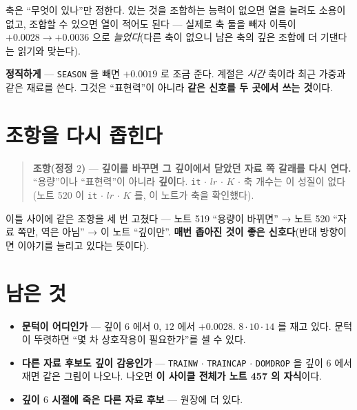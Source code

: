 \documentclass[11pt]{article}
\begin{document}
축은 ``무엇이 있나''만 정한다. 있는 것을 조합하는 능력이 없으면 열을
늘려도 소용이 없고, 조합할 수 있으면 열이 적어도 된다 --- 실제로 축 둘을
빼자 이득이 $+0.0028 \to +0.0036$ 으로 \emph{늘었다}(다른 축이 없으니
남은 축의 깊은 조합에 더 기댄다는 읽기와 맞는다).

\textbf{정직하게} --- \texttt{SEASON} 을 빼면 $+0.0019$ 로 조금 준다.
계절은 \emph{시간} 축이라 최근 가중과 같은 재료를 쓴다. 그것은
``표현력''이 아니라 \textbf{같은 신호를 두 곳에서 쓰는 것}이다.

\section{조항을 다시 좁힌다}

\begin{quote}
\textbf{조항(정정 $2$)} --- \textbf{깊이를 바꾸면 그 깊이에서 닫았던 자료
쪽 갈래를 다시 연다.} ``용량''이나 ``표현력''이 아니라 \textbf{깊이}다.
\texttt{it} $\cdot$ $lr$ $\cdot$ $K$ $\cdot$ 축 개수는 이 성질이 없다
(노트 520 이 \texttt{it} $\cdot$ $lr$ $\cdot$ $K$ 를, 이 노트가 축을
확인했다).
\end{quote}

이틀 사이에 같은 조항을 세 번 고쳤다 --- 노트 519 ``용량이 바뀌면'' →
노트 520 ``자료 쪽만, 역은 아님'' → 이 노트 ``깊이만''. \textbf{매번 좁아진
것이 좋은 신호다}(반대 방향이면 이야기를 늘리고 있다는 뜻이다).

\section*{남은 것}

\begin{itemize}
\item \textbf{문턱이 어디인가} --- 깊이 $6$ 에서 $0$, $12$ 에서 $+0.0028$.
$8 \cdot 10 \cdot 14$ 를 재고 있다. 문턱이 뚜렷하면 ``몇 차 상호작용이
필요한가''를 셀 수 있다.
\item \textbf{다른 자료 후보도 깊이 감응인가} --- \texttt{TRAINW} $\cdot$
\texttt{TRAINCAP} $\cdot$ \texttt{DOMDROP} 을 깊이 $6$ 에서 재면 같은
그림이 나오나. 나오면 \textbf{이 사이클 전체가 노트 457 의 자식}이다.
\item \textbf{깊이 $6$ 시절에 죽은 다른 자료 후보} --- 원장에 더 있다.
\end{itemize}
\end{document}

